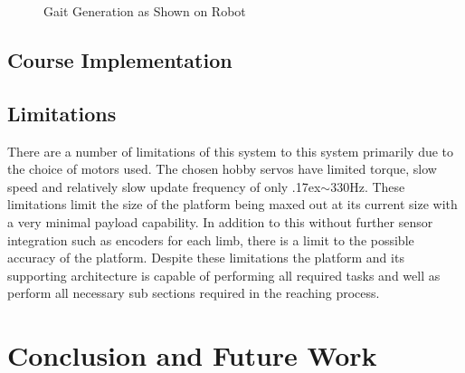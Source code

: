 \documentclass[12pt]{report}
\newcommand{\approximately}{{\raise.17ex\hbox{$\scriptstyle\mathtt{\sim}$}}}
\begin{document}
\begin{figure}[H]
%
    \caption{Gait Generation as Shown on Robot}
    \label{fig:finalMotion}
\end{figure}




\section{Course Implementation}






\section{Limitations}
There are a number of limitations of this system to this system primarily due to the choice of motors used. The chosen hobby servos have limited torque, slow speed and relatively slow update frequency of only \approximately330Hz. These limitations limit the size of the platform being maxed out at its current size with a very minimal payload capability. In addition to this without further sensor integration such as encoders for each limb, there is a limit to the possible accuracy of the platform. Despite these limitations the platform and its supporting architecture is capable of performing all required tasks and well as perform all necessary sub sections required in the reaching process. 


\chapter{Conclusion and Future Work}
\end{document}
